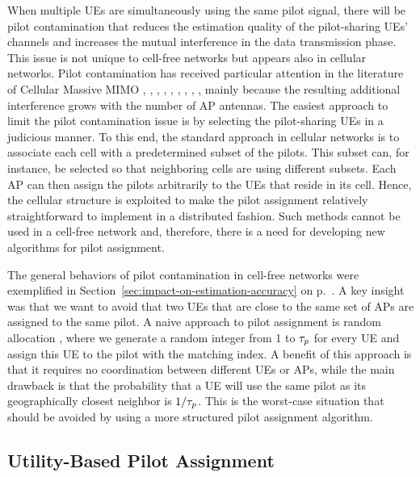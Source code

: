When multiple UEs are simultaneously using the same pilot signal, there will be pilot contamination that reduces the estimation quality of the pilot-sharing UEs' channels and increases the mutual interference in the data transmission phase. This issue is not unique to cell-free networks but appears also in cellular networks. Pilot contamination has received particular attention in the literature of Cellular Massive MIMO \cite{Adhikary2017a}, \cite{ashikhmin2012pilot}, \cite{BjornsonHS17}, \cite{Jose2011b}, \cite{Marzetta2010a}, \cite{Mueller2014b}, \cite{Rusek2013a}, \cite{Sanguinetti2019a}, \cite{Yin2016a}, mainly because the resulting additional interference grows with the number of AP antennas. 
The easiest approach to limit the pilot contamination issue is by selecting the pilot-sharing UEs in a judicious manner. To this end, the standard approach in cellular networks is  to associate each cell with a predetermined subset of the pilots. This subset can, for instance, be selected so that neighboring cells are using different subsets. 
Each AP can then assign the pilots arbitrarily to the UEs that reside in its cell. Hence, the cellular structure is exploited to make the pilot assignment relatively straightforward to implement in a distributed fashion. Such methods cannot be used in a cell-free network and, therefore, there is a need for developing new algorithms for pilot assignment.

The general behaviors of pilot contamination in cell-free networks were exemplified in Section~\ref{sec:impact-on-estimation-accuracy} on p.~\pageref{sec:impact-on-estimation-accuracy}. A key insight was that we want to avoid that two UEs that are close to the same set of APs are assigned to the same pilot. A naive approach to pilot assignment is random allocation \cite{Interdonato2018}, where we generate a random integer from 1 to $\tau_{p}$ for every UE and assign this UE to the pilot with the matching index. A benefit of this approach is that it requires no coordination between different UEs or APs, while the main drawback is that the probability that a UE will use the same pilot as its geographically closest neighbor is $1/\tau_{p}$. This is the worst-case situation that should be avoided by using a more structured pilot assignment algorithm.





\subsection{Utility-Based Pilot Assignment}

